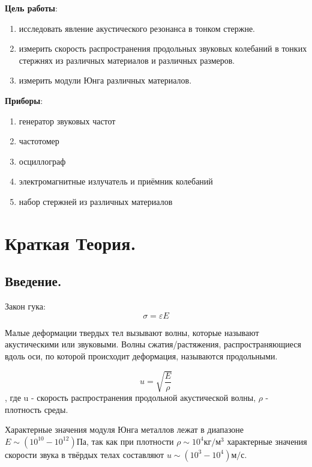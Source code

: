 \documentclass[a4paper,12pt]{article} %
\begin{document}

\tableofcontents

\textbf{Цель работы}:
\begin{enumerate}
  \item исследовать явление акустического резонанса в тонком стержне.
  \item измерить скорость распространения продольных звуковых колебаний в тонких стержнях из различных материалов и различных размеров.
  \item измерить модули Юнга различных материалов.
\end{enumerate}

\textbf{Приборы}:
\begin{enumerate}
  \item генератор звуковых частот
  \item частотомер
  \item осциллограф
  \item электромагнитные излучатель и приёмник колебаний
  \item набор стержней из различных материалов
\end{enumerate}

\section{Краткая Теория.}
\subsection{Введение.}
Закон гука:
\begin{equation}
  \sigma =  \varepsilon E
  \label{eq:1}
\end{equation}

Малые деформации твердых тел вызывают волны, которые называют акустическими или звуковыми.
Волны сжатия/растяжения, распространяющиеся вдоль оси, по которой происходит деформация, называются продольными.

\begin{equation}
  u =  \sqrt{\frac{E}{\rho}}
  \label{eq:2}
\end{equation}
, где u - скорость распространения продольной акустической волны, 
$\rho$ - плотность среды.

Характерные значения модуля Юнга металлов лежат в диапазоне $E \sim (10^{10} - 10^{12}) \text{Па}$, так как при плотности $\rho \sim 10^4 \text{кг}/\text{м}^3$ характерные значения скорости звука в
твёрдых телах составляют $u \sim (10^3 - 10^4) \text{м/с}$.
\end{document}
